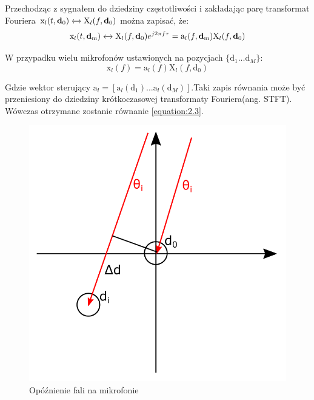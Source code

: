 \noindent Przechodząc z sygnałem do dziedziny częstotliwości i zakładając parę transformat Fouriera $\mathrm{x}_{l}(t,\bm{\mathrm{d}}_{0})\xleftrightarrow{}\mathrm{X}_{l}(f,\bm{\mathrm{d}}_{0})$ można zapisać, że:
\begin{equation}
    \label{equation:2.6}
    \mathrm{x}_{l}(t,\bm{\mathrm{d}}_{\mathrm{m}}) \xleftrightarrow{} \mathrm{X}_{l}(f,\bm{\mathrm{d}}_{0})e^{j 2 \pi f \tau} =
    \mathrm{a}_{l}(f,\bm{\mathrm{d}}_{\mathrm{m}}) \mathrm{X}_{l}(f,\bm{\mathrm{d}}_{0}) 
\end{equation}

\noindent W przypadku wielu mikrofonów ustawionych na pozycjach $\{\bm{\mathrm{d}}_{1}...\bm{\mathrm{d}}_{M} \}$:
\begin{equation}
    \label{equation:2.7}
    \bm{\mathrm{x}}_l(f)=
    \bm{\mathrm{a}}_l(f)\mathrm{X}_{l}(f,\bm{\mathrm{d}}_{0})
\end{equation}

\noindent Gdzie wektor sterujący $\bm{\mathrm{a}}_{l} = [\mathrm{a}_{l}(\bm{\mathrm{d}}_{1})...\mathrm{a}_{l}(\bm{\mathrm{d}}_{M})]$.Taki zapis równania może być przeniesiony do dziedziny krótkoczasowej transformaty Fouriera(ang. STFT). Wówczas otrzymane zostanie równanie \eqref{equation:2.3}.

\begin{figure}[h]
    \centering
    \includegraphics[width=\textwidth]{Images/direction.png}
    \caption{Opóźnienie fali na mikrofonie}
    \label{fig:direction}
\end{figure}

